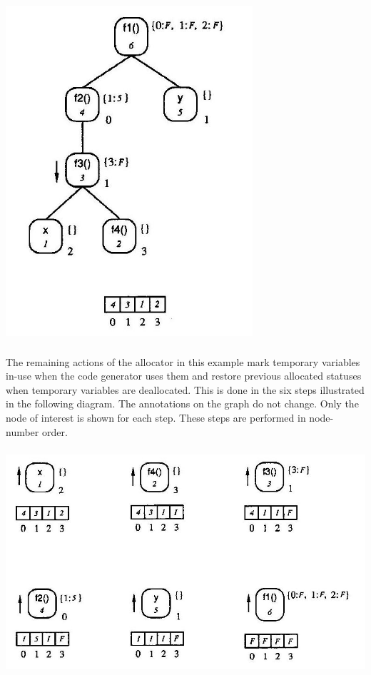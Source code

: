 {\centering{}
\includegraphics[width=3.6in,height=5.0in]{kw/figure8-5.png}
\par}


The remaining actions of the allocator in this example mark temporary
variables in-use when the code generator uses them and restore
previous allocated statuses when temporary variables are
deallocated. This is done in the six steps illustrated in the
following diagram. The annotations on the graph do not change. Only
the node of interest is shown for each step. These steps are performed
in node-number order.

{\centering{}
 \includegraphics[width=6.0in,height=3.3in]{kw/figure8-6.png}  
\par}


